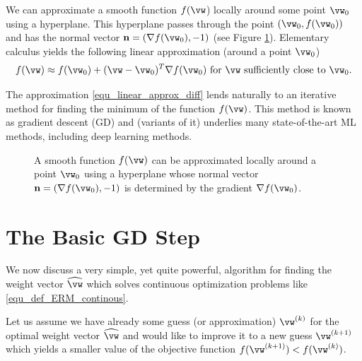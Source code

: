 \documentclass[12pt]{report}
\begin{document}
We can approximate a smooth function $f(\vw$) locally around some point $\vw_{0}$ 
using a hyperplane. This hyperplane passes through the point $(\vw_{0},f(\vw_{0}))$ and 
has the normal vector $\mathbf{n} = (\nabla f(\vw_{0}),-1)$ (see Figure \ref{fig_smooth_function}). 
Elementary calculus yields the following linear approximation (around a point $\vw_{0}$) 
\cite{RudinBookPrinciplesMatheAnalysis}
\begin{equation} 
\label{equ_linear_approx_diff}
f(\vw) \approx f(\vw_{0}) + (\vw-\vw_{0})^{T} \nabla f(\vw_{0}) \mbox{ for }\vw \mbox{ sufficiently close to } \vw_{0}.
\end{equation}  

The approximation \eqref{equ_linear_approx_diff} lends naturally to an 
iterative method for finding the minimum of the function $f(\vw)$. This 
method is known as gradient descent (GD) and (variants of it) underlies 
many state-of-the-art ML methods, including deep learning methods. 

\begin{figure}[htbp]
\begin{center}
\end{center}
\caption{A smooth function $f(\vw)$ can be approximated locally around 
	a point $\vw_{0}$ using a hyperplane whose normal vector 
	$\mathbf{n} = (\nabla f(\vw_{0}),-1)$ is determined by the 
	gradient $\nabla f(\vw_{0})$.}
\label{fig_smooth_function}
\end{figure}



\section{The Basic GD Step}
\label{sec_basic_GD_iteration}

We now discuss a very simple, yet quite powerful, algorithm for 
finding the weight vector $\widehat{\vw}$ which solves continuous 
optimization problems like \eqref{equ_def_ERM_continous}. 

Let us assume we have already some guess (or approximation) 
$\vw^{(k)}$ for the optimal weight vector $\widehat{\vw}$ and 
would like to improve it to a new guess $\vw^{(k+1)}$ which yields 
a smaller value of the objective function $f(\vw^{(k+1)}) < f(\vw^{(k)})$. 
\end{document}
